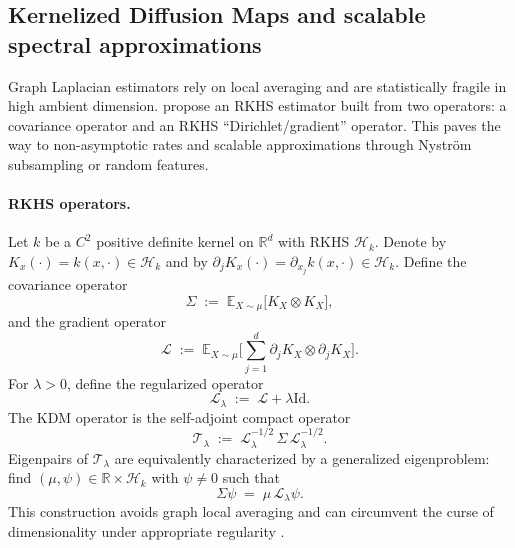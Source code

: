 \documentclass[11pt]{article}
\theoremstyle{remark}
\newcommand{\Hk}{\mathcal{H}}
\newcommand{\Id}{\mathrm{Id}}
\newcommand{\R}{\mathbb{R}}
\newcommand{\E}{\mathbb{E}}
\begin{document}
\subsection{Kernelized Diffusion Maps and scalable spectral approximations}
\label{subsec:kdm}
Graph Laplacian estimators rely on local averaging and are statistically fragile in high ambient dimension.
\citet{pmlr-v195-pillaud-vivien23a} propose an RKHS estimator built from two operators: a covariance operator and an RKHS ``Dirichlet/gradient'' operator.
This paves the way to non-asymptotic rates and scalable approximations through Nystr\"om subsampling or random features.

\paragraph{RKHS operators.}
Let $k$ be a $C^2$ positive definite kernel on $\R^d$ with RKHS $\Hk_k$.
Denote by $K_x(\cdot)=k(x,\cdot)\in\Hk_k$ and by $\partial_j K_x(\cdot)=\partial_{x_j}k(x,\cdot)\in\Hk_k$.
Define the covariance operator
\begin{equation}
\Sigma
\;:=\;
\E_{X\sim\mu}\big[ K_X \otimes K_X \big],
\label{eq:pv_sigma_pop}
\end{equation}
and the gradient operator
\begin{equation}
\mathcal{L}
\;:=\;
\E_{X\sim\mu}\Big[\sum_{j=1}^d \partial_j K_X \otimes \partial_j K_X \Big].
\label{eq:pv_L_pop}
\end{equation}
For $\lambda>0$, define the regularized operator
\begin{equation}
\mathcal{L}_\lambda \;:=\; \mathcal{L}+\lambda \Id.
\label{eq:pv_Llam_pop}
\end{equation}
The KDM operator is the self-adjoint compact operator
\begin{equation}
\mathcal{T}_\lambda
\;:=\;
\mathcal{L}_\lambda^{-1/2}\,\Sigma\,\mathcal{L}_\lambda^{-1/2}.
\label{eq:pv_T_pop}
\end{equation}
Eigenpairs of $\mathcal{T}_\lambda$ are equivalently characterized by a generalized eigenproblem:
find $(\mu,\psi)\in\R\times\Hk_k$ with $\psi\neq 0$ such that
\begin{equation}
\Sigma \psi \;=\; \mu\, \mathcal{L}_\lambda \psi.
\label{eq:pv_gen_eig_pop}
\end{equation}
This construction avoids graph local averaging and can circumvent the curse of dimensionality under appropriate regularity \citep{pmlr-v195-pillaud-vivien23a}.
\end{document}

